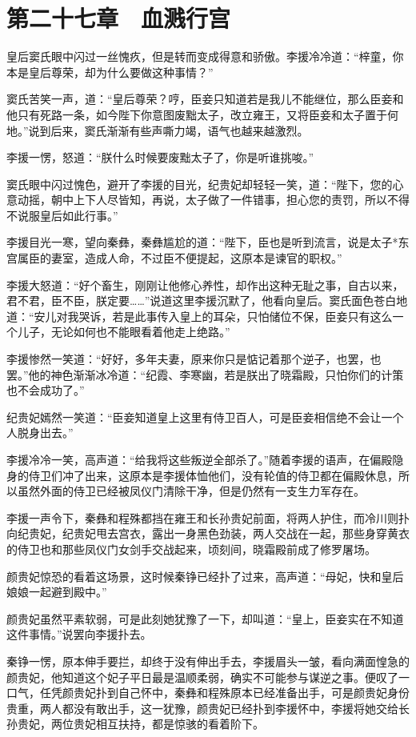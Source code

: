 \chapter{第二十七章　血溅行宫}

皇后窦氏眼中闪过一丝愧疚，但是转而变成得意和骄傲。李援冷冷道：“梓童，你本是皇后尊荣，却为什么要做这种事情？”

窦氏苦笑一声，道：“皇后尊荣？哼，臣妾只知道若是我儿不能继位，那么臣妾和他只有死路一条，如今陛下你意图废黜太子，改立雍王，又将臣妾和太子置于何地。”说到后来，窦氏渐渐有些声嘶力竭，语气也越来越激烈。

李援一愣，怒道：“朕什么时候要废黜太子了，你是听谁挑唆。”

窦氏眼中闪过愧色，避开了李援的目光，纪贵妃却轻轻一笑，道：“陛下，您的心意动摇，朝中上下人尽皆知，再说，太子做了一件错事，担心您的责罚，所以不得不说服皇后如此行事。”

李援目光一寒，望向秦彝，秦彝尴尬的道：“陛下，臣也是听到流言，说是太子*东宫属臣的妻室，造成人命，不过臣不便提起，这原本是谏官的职权。”

李援大怒道：“好个畜生，刚刚让他修心养性，却作出这种无耻之事，自古以来，君不君，臣不臣，朕定要……”说道这里李援沉默了，他看向皇后。窦氏面色苍白地道：“安儿对我哭诉，若是此事传入皇上的耳朵，只怕储位不保，臣妾只有这么一个儿子，无论如何也不能眼看着他走上绝路。”

李援惨然一笑道：“好好，多年夫妻，原来你只是惦记着那个逆子，也罢，也罢。”他的神色渐渐冰冷道：“纪霞、李寒幽，若是朕出了晓霜殿，只怕你们的计策也不会成功了。”

纪贵妃嫣然一笑道：“臣妾知道皇上这里有侍卫百人，可是臣妾相信绝不会让一个人脱身出去。”

李援冷冷一笑，高声道：“给我将这些叛逆全部杀了。”随着李援的语声，在偏殿隐身的侍卫们冲了出来，这原本是李援体恤他们，没有轮值的侍卫都在偏殿休息，所以虽然外面的侍卫已经被凤仪门清除干净，但是仍然有一支生力军存在。

李援一声令下，秦彝和程殊都挡在雍王和长孙贵妃前面，将两人护住，而冷川则扑向纪贵妃，纪贵妃甩去宫衣，露出一身黑色劲装，两人交战在一起，那些身穿黄衣的侍卫也和那些凤仪门女剑手交战起来，顷刻间，晓霜殿前成了修罗屠场。

颜贵妃惊恐的看着这场景，这时候秦铮已经扑了过来，高声道：“母妃，快和皇后娘娘一起避到殿中。”

颜贵妃虽然平素软弱，可是此刻她犹豫了一下，却叫道：“皇上，臣妾实在不知道这件事情。”说罢向李援扑去。

秦铮一愣，原本伸手要拦，却终于没有伸出手去，李援眉头一皱，看向满面惶急的颜贵妃，他知道这个妃子平日最是温顺柔弱，确实不可能参与谋逆之事。便叹了一口气，任凭颜贵妃扑到自己怀中，秦彝和程殊原本已经准备出手，可是颜贵妃身份贵重，两人都没有敢出手，这一犹豫，颜贵妃已经扑到李援怀中，李援将她交给长孙贵妃，两位贵妃相互扶持，都是惊骇的看着阶下。

